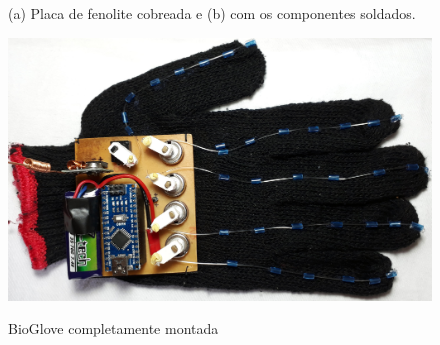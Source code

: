 \documentclass[
	12pt,				%
	openright,			%
	oneside,			%
	a4paper,			%
	english,			%
	brazil				%
	]{abntex2}
\begin{document}
	
	\begin{figure}[!htb]
		 \centering
		 \caption{(a) Placa de fenolite cobreada e (b) com os componentes soldados.} 
		 \centering
		 \label{Fig:phenolic-and-ready}
	\end{figure}

	

		\begin{figure}[h!]
			\centering
			\caption{BioGlove completamente montada}
  		\includegraphics[width=14cm,keepaspectratio=true]{figures/glove-ready1.jpg}
  		\label{Fig:glove-ready1}
		\end{figure}
\end{document}
